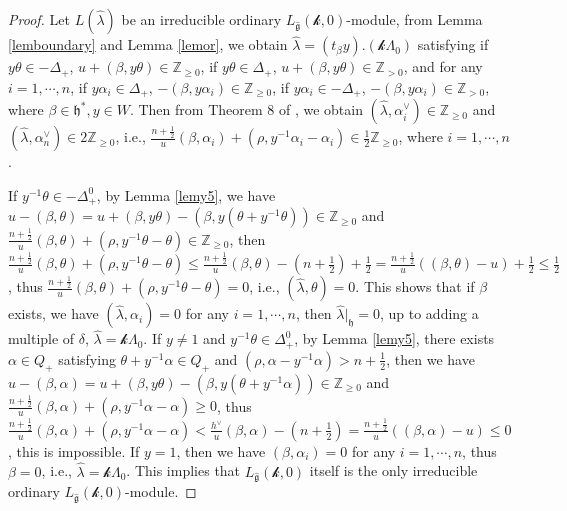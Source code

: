\documentclass[12pt]{article}
\begin{document}
\begin{proof}
Let $L(\hat{\lambda})$ be an irreducible ordinary $L_{\widehat{\mathfrak{g}}}(\mathcal{k},0)$-module,
from Lemma \ref{lemboundary} and Lemma \ref{lemor}, we obtain $\hat{\lambda}=(t_\beta y).(\mathcal{k}\Lambda_0)$
satisfying if $y\theta\in -\Delta_+$, $u+(\beta,y\theta)\in\mathbb{Z}_{\geq0}$,
if $y\theta\in \Delta_+$, $u+(\beta,y\theta)\in\mathbb{Z}_{>0}$,
and for any $i=1,\cdots,n$,
if $y\alpha_i\in \Delta_+$, $-(\beta,y\alpha_i)\in\mathbb{Z}_{\geq0}$,
if $y\alpha_i\in -\Delta_+$, $-(\beta,y\alpha_i)\in\mathbb{Z}_{>0}$,
where $\beta\in \mathfrak{h}^*, y\in W$.
Then from Theorem 8 of \cite{Kac77},
we obtain
$(\hat{\lambda}, \alpha_i^\vee)\in \mathbb{Z}_{\geq0}$ and $(\hat{\lambda}, \alpha_n^\vee)\in 2\mathbb{Z}_{\geq0}$,
 i.e., $\frac{n+\frac{1}{2}}{u}(\beta,\alpha_i)+(\rho,y^{-1}\alpha_i-\alpha_i)\in \frac{1}{2}\mathbb{Z}_{\geq0}$,
 where $i=1,\cdots,n$.

If $y^{-1}\theta\in -\Delta_+^0$, by Lemma \ref{lemy5},
we have $u-(\beta,\theta)= u+(\beta,y\theta)-(\beta,y(\theta+y^{-1}\theta))\in\mathbb{Z}_{\geq0}$
and $\frac{n+\frac{1}{2}}{u}(\beta,\theta)+(\rho,y^{-1}\theta-\theta)\in\mathbb{Z}_{\geq0}$,
then $\frac{n+\frac{1}{2}}{u}(\beta,\theta)+(\rho,y^{-1}\theta-\theta)\leq \frac{n+\frac{1}{2}}{u}(\beta,\theta)-(n+\frac{1}{2})+\frac{1}{2}
=\frac{n+\frac{1}{2}}{u}((\beta,\theta)-u)+\frac{1}{2}\leq \frac{1}{2}$,
thus $\frac{n+\frac{1}{2}}{u}(\beta,\theta)+(\rho,y^{-1}\theta-\theta)=0$,
i.e., $(\hat{\lambda}, \theta)=0$. This shows that if $\beta$ exists,
we have $(\hat{\lambda}, \alpha_i)=0$ for any $i=1,\cdots,n$,
then $\hat{\lambda}|_{\mathfrak{h}}=0$, up to adding a multiple of $\delta$, $\hat{\lambda}=\mathcal{k}\Lambda_0$.
If $y\ne 1$ and $y^{-1}\theta\in \Delta_+^0$, by Lemma \ref{lemy5}, there exists $\alpha\in Q_+$ satisfying $\theta+y^{-1}\alpha\in Q_+$ and $(\rho,\alpha-y^{-1}\alpha)>n+\frac{1}{2}$,
then we have $u-(\beta,\alpha)= u+(\beta,y\theta)-(\beta,y(\theta+y^{-1}\alpha))\in\mathbb{Z}_{\geq0}$ and $\frac{n+\frac{1}{2}}{u}(\beta,\alpha)+(\rho,y^{-1}\alpha-\alpha)\geq0$, thus $\frac{n+\frac{1}{2}}{u}(\beta,\alpha)+(\rho,y^{-1}\alpha-\alpha)< \frac{h^\vee}{u}(\beta,\alpha)-(n+\frac{1}{2})
=\frac{n+\frac{1}{2}}{u}((\beta,\alpha)-u)\leq 0$,
this is impossible.
If $y=1$, then we have $(\beta,\alpha_i)=0$ for any $i=1,\cdots,n$, thus $\beta=0$, i.e., $\hat{\lambda}=\mathcal{k}\Lambda_0$.
This implies that $L_{\widehat{\mathfrak{g}}}(\mathcal{k},0)$ itself is the only irreducible ordinary $L_{\widehat{\mathfrak{g}}}(\mathcal{k},0)$-module.
\end{proof}
\end{document}
